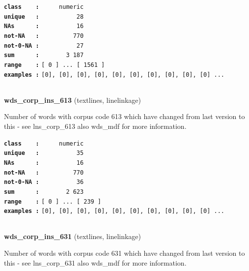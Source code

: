 \documentclass[]{article}
\begin{document}
\textbf{\texttt{class\ \ \ \ :}} \texttt{~~~~~numeric}\\
\textbf{\texttt{unique\ \ \ :}} \texttt{~~~~~~~~~~28}\\
\textbf{\texttt{NAs\ \ \ \ \ \ :}} \texttt{~~~~~~~~~~16}\\
\textbf{\texttt{not-NA\ \ \ :}} \texttt{~~~~~~~~~770}\\
\textbf{\texttt{not-0-NA\ :}} \texttt{~~~~~~~~~~27}\\
\textbf{\texttt{sum\ \ \ \ \ \ :}} \texttt{~~~~~~~3~187}\\
\textbf{\texttt{range\ \ \ \ :}}
\texttt{{[}\ 0\ {]}\ ...\ {[}\ 1561\ {]}}\\
\textbf{\texttt{examples\ :}}
\texttt{{[}0{]},\ {[}0{]},\ {[}0{]},\ {[}0{]},\ {[}0{]},\ {[}0{]},\ {[}0{]},\ {[}0{]},\ {[}0{]},\ {[}0{]}\ ...}\\

~

\textbf{wds\_corp\_ins\_613} (textlines, linelinkage)

Number of words with corpus code 613 which have changed from last
version to this - see lns\_corp\_613 also wds\_mdf for more information.

\textbf{\texttt{class\ \ \ \ :}} \texttt{~~~~~numeric}\\
\textbf{\texttt{unique\ \ \ :}} \texttt{~~~~~~~~~~35}\\
\textbf{\texttt{NAs\ \ \ \ \ \ :}} \texttt{~~~~~~~~~~16}\\
\textbf{\texttt{not-NA\ \ \ :}} \texttt{~~~~~~~~~770}\\
\textbf{\texttt{not-0-NA\ :}} \texttt{~~~~~~~~~~36}\\
\textbf{\texttt{sum\ \ \ \ \ \ :}} \texttt{~~~~~~~2~623}\\
\textbf{\texttt{range\ \ \ \ :}}
\texttt{{[}\ 0\ {]}\ ...\ {[}\ 239\ {]}}\\
\textbf{\texttt{examples\ :}}
\texttt{{[}0{]},\ {[}0{]},\ {[}0{]},\ {[}0{]},\ {[}0{]},\ {[}0{]},\ {[}0{]},\ {[}0{]},\ {[}0{]},\ {[}0{]}\ ...}\\

~

\textbf{wds\_corp\_ins\_631} (textlines, linelinkage)

Number of words with corpus code 631 which have changed from last
version to this - see lns\_corp\_631 also wds\_mdf for more information.
\end{document}
